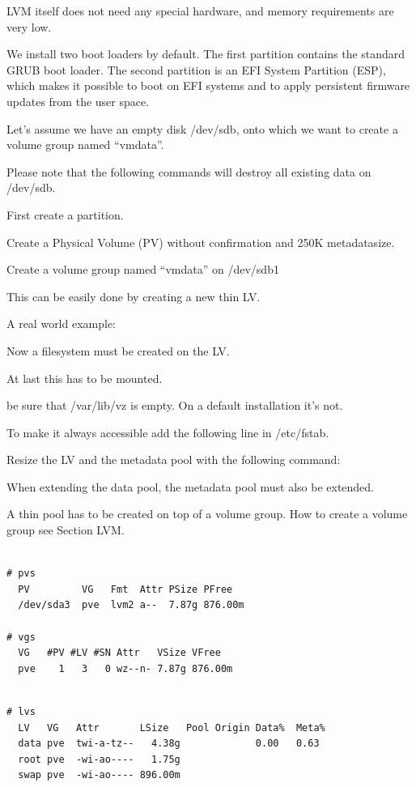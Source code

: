 LVM itself does not need any special hardware, and memory requirements are very low.

We install two boot loaders by default. The first partition contains the standard GRUB boot loader. The second partition is an EFI System Partition (ESP), which makes it possible to boot on EFI systems and to apply persistent firmware updates from the user space.

Let’s assume we have an empty disk /dev/sdb, onto which we want to create a volume group named “vmdata”.

Please note that the following commands will destroy all existing data on /dev/sdb.

First create a partition.

Create a Physical Volume (PV) without confirmation and 250K metadatasize.

Create a volume group named “vmdata” on /dev/sdb1

This can be easily done by creating a new thin LV.

A real world example:

Now a filesystem must be created on the LV.

At last this has to be mounted.

be sure that /var/lib/vz is empty. On a default installation it’s not.

To make it always accessible add the following line in /etc/fstab.

Resize the LV and the metadata pool with the following command:

When extending the data pool, the metadata pool must also be extended.

A thin pool has to be created on top of a volume group. How to create a volume group see Section LVM.

\begin{lstlisting}

# pvs
  PV         VG   Fmt  Attr PSize PFree
  /dev/sda3  pve  lvm2 a--  7.87g 876.00m

# vgs
  VG   #PV #LV #SN Attr   VSize VFree
  pve    1   3   0 wz--n- 7.87g 876.00m

\end{lstlisting}

\begin{lstlisting}

# lvs
  LV   VG   Attr       LSize   Pool Origin Data%  Meta%
  data pve  twi-a-tz--   4.38g             0.00   0.63
  root pve  -wi-ao----   1.75g
  swap pve  -wi-ao---- 896.00m

\end{lstlisting}

